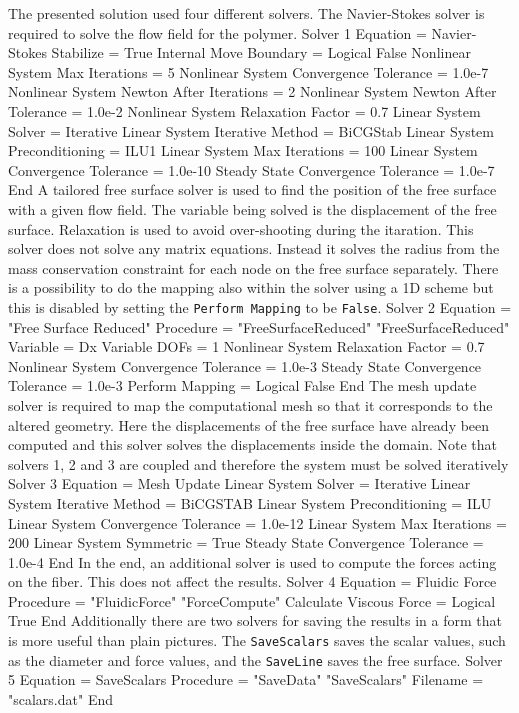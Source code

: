 The presented solution used four different solvers. 
The Navier-Stokes solver is required to solve the flow field
for the polymer.
\ttbegin
Solver 1
  Equation = Navier-Stokes
  Stabilize = True
  Internal Move Boundary = Logical False
  Nonlinear System Max Iterations = 5
  Nonlinear System Convergence Tolerance = 1.0e-7
  Nonlinear System Newton After Iterations = 2
  Nonlinear System Newton After Tolerance = 1.0e-2
  Nonlinear System Relaxation Factor = 0.7
  Linear System Solver = Iterative
  Linear System Iterative Method = BiCGStab 
  Linear System Preconditioning = ILU1
  Linear System Max Iterations = 100
  Linear System Convergence Tolerance = 1.0e-10
  Steady State Convergence Tolerance = 1.0e-7
End
\ttend
%
A tailored free surface solver is used to find the 
position of the free surface with a given flow field.
The variable being solved is the displacement of the free surface.
Relaxation is used to avoid over-shooting during the itaration.
This solver does not solve any matrix equations. Instead it solves
the radius from the mass conservation constraint for each node on the
free surface separately. There is a possibility to do the mapping also 
within the solver using a 1D scheme but this is disabled by setting
the \texttt{Perform Mapping} to be \texttt{False}.
\ttbegin
Solver 2
  Equation = "Free Surface Reduced"
  Procedure = "FreeSurfaceReduced" "FreeSurfaceReduced"
  Variable = Dx
  Variable DOFs = 1
  Nonlinear System Relaxation Factor = 0.7
  Nonlinear System Convergence Tolerance = 1.0e-3
  Steady State Convergence Tolerance = 1.0e-3
  Perform Mapping = Logical False
End
\ttend
%
The mesh update solver is required to map the computational mesh
so that it corresponds to the altered geometry.
Here the displacements of the free surface have already been computed
and this solver solves the displacements inside the domain.
Note that solvers 1, 2 and 3 are coupled and therefore the system must be solved iteratively
\ttbegin
Solver 3
  Equation = Mesh Update
  Linear System Solver = Iterative 
  Linear System Iterative Method = BiCGSTAB
  Linear System Preconditioning = ILU
  Linear System Convergence Tolerance = 1.0e-12
  Linear System Max Iterations = 200
  Linear System Symmetric = True
  Steady State Convergence Tolerance = 1.0e-4
End
\ttend
%
In the end, an additional solver is used to compute the forces
acting on the fiber. This does not affect the results.
\ttbegin
Solver 4 
  Equation = Fluidic Force
  Procedure = "FluidicForce" "ForceCompute"
  Calculate Viscous Force = Logical True
End
\ttend
%
Additionally there are two solvers for saving the results in a form
that is more useful than plain pictures. The \texttt{SaveScalars} saves
the scalar values, such as the diameter and force values,
and the \texttt{SaveLine} saves the free surface.
\ttbegin
Solver 5
  Equation = SaveScalars
  Procedure = "SaveData" "SaveScalars"
  Filename = "scalars.dat"
End 

